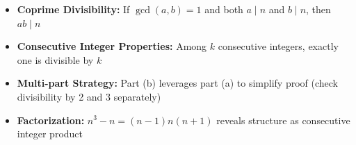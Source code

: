 \begin{takeaways}
\begin{itemize}
\item \textbf{Coprime Divisibility:} If $\gcd(a,b) = 1$ and both $a \mid n$ and $b \mid n$, then $ab \mid n$
\item \textbf{Consecutive Integer Properties:} Among $k$ consecutive integers, exactly one is divisible by $k$
\item \textbf{Multi-part Strategy:} Part (b) leverages part (a) to simplify proof (check divisibility by 2 and 3 separately)
\item \textbf{Factorization:} $n^3 - n = (n-1)n(n+1)$ reveals structure as consecutive integer product
\end{itemize}
\end{takeaways}
